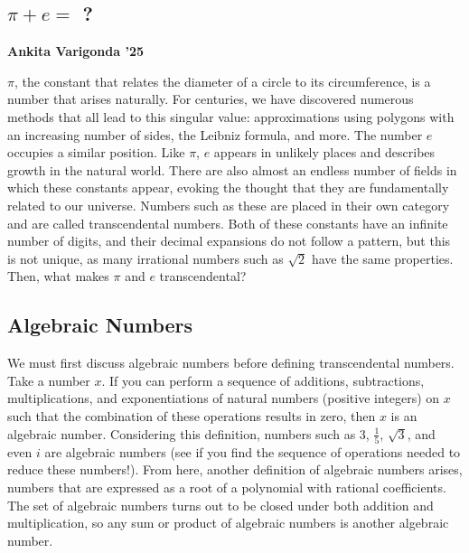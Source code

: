 \documentclass{article}
\begin{document}
\pagestyle{fancy}



\renewcommand*\contentsname{\textbf{Table of Contents}}
\tableofcontents
\thispagestyle{fancy}
\vspace{60pt}
\pagebreak

\begin{multicols}{2}

\section*{$\pi + e =$ ?}
\noindent\textbf{Ankita Varigonda '25}
\medbreak

$\pi$, the constant that relates the diameter of a circle to its circumference, is a number that arises naturally. For centuries, we have discovered numerous methods that all lead to this singular value: approximations using polygons with an increasing number of sides, the Leibniz formula, and more. The number $e$ occupies a similar position. Like $\pi$, $e$ appears in unlikely places and describes growth in the natural world. There are also almost an endless number of fields in which these constants appear, evoking the thought that they are fundamentally related to our universe. Numbers such as these are placed in their own category and are called transcendental numbers. Both of these constants have an infinite number of digits, and their decimal expansions do not follow a pattern, but this is not unique, as many irrational numbers such as $\sqrt{2}$ have the same properties. Then, what makes $\pi$ and $e$ transcendental?

\subsection*{Algebraic Numbers}

We must first discuss algebraic numbers before defining transcendental numbers. Take a number $x$. If you can perform a sequence of additions, subtractions, multiplications, and exponentiations of natural numbers (positive integers) on $x$ such that the combination of these operations results in zero, then $x$ is an algebraic number. Considering this definition, numbers such as $3$, $\frac{1}{5}$, $\sqrt{3}$, and even $i$ are algebraic numbers (see if you find the sequence of operations needed to reduce these numbers!). From here, another definition of algebraic numbers arises, numbers that are expressed as a root of a polynomial with rational coefficients. The set of algebraic numbers turns out to be closed under both addition and multiplication, so any sum or product of algebraic numbers is another algebraic number.


\end{multicols}
\end{document}
